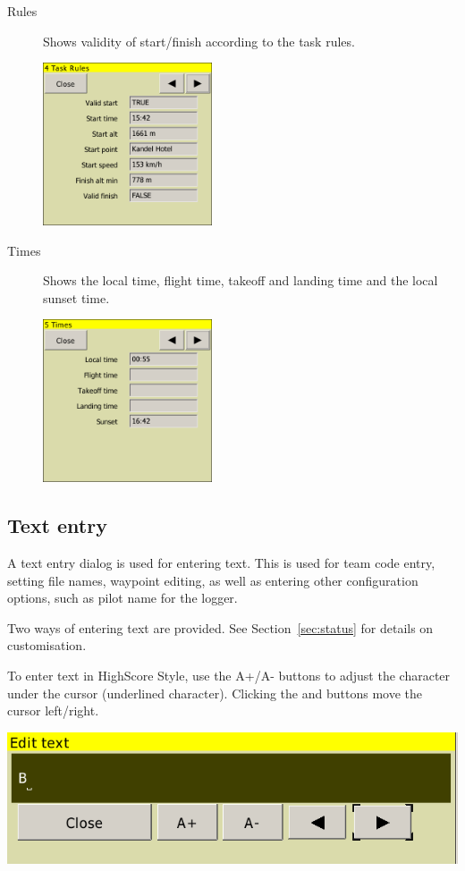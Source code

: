\documentclass[a4paper,12pt]{refrep}
\begin{document}
\begin{description}
\item[Rules] Shows validity of start/finish according to the task rules.
\begin{center}
\includegraphics[angle=0,width=5cm,keepaspectratio='true']{figures/status-rules.png}
\end{center}

\item[Times]  Shows the local time, flight time, takeoff and landing time and
the local sunset time.
\begin{center}
\includegraphics[angle=0,width=5cm,keepaspectratio='true']{figures/status-times.png}
\end{center}
\end{description}

\subsection*{Text entry}
A text entry dialog is used for entering text.  This is used for team
code entry, setting file names, waypoint editing, as well as entering
other configuration options, such as pilot name for the logger.

Two ways of entering text are provided. See Section~\ref{sec:status} for details on customisation.

To enter text in HighScore Style, use the A+/A- buttons to adjust the character under the
cursor (underlined character). Clicking the \button{$<$} and \button{$>$} buttons move the
cursor left/right.  

\begin{center}
\includegraphics[angle=0,width=\linewidth,keepaspectratio='true']{figures/textentry.png}
\end{center}
\end{document}
